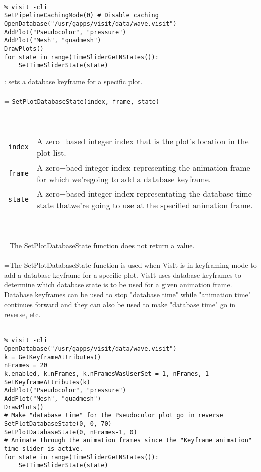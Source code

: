 \documentclass[10pt,a4paper]{report}
\begin{document}
\\[-6mm]
\begin{verbatim}% visit -cli
SetPipelineCachingMode(0) # Disable caching
OpenDatabase("/usr/gapps/visit/data/wave.visit")
AddPlot("Pseudocolor", "pressure")
AddPlot("Mesh", "quadmesh")
DrawPlots()
for state in range(TimeSliderGetNStates()):
    SetTimeSliderState(state)
\end{verbatim}
\newpage


{}
: sets a database keyframe for a specific plot.\\[-3mm]

 \\ 
\hangindent=\parindent 
\verb!SetPlotDatabaseState(index, frame, state)!\\ [-3mm]

 \\ 
\hangindent=\parindent 
\begin{tabular}{lp{9cm}}
\verb!index! & A zero$-$based integer index that is the plot's location in the plot list. \\
\verb!frame! & A zero$-$baed integer index representing the animation frame for which we'regoing to add a database keyframe. \\
\verb!state! & A zero$-$based integer index representating the database time state thatwe're going to use at the specified animation frame. \\
\end{tabular} \\[-2mm]


 \\ 
\hangindent=\parindent The SetPlotDatabaseState function does not return a value. \\[-3mm] 

 \\ 
\hangindent=\parindent The SetPlotDatabaseState function is used when VisIt is in keyframing mode to add a database keyframe for a specific plot. VisIt uses database keyframes to determine which database state is to be used for a given animation frame. Database keyframes can be used to stop "database time" while "animation time" continues forward and they can also be used to make "database time" go in reverse, etc. \\[-3mm] 

\\[-6mm]
\begin{verbatim}% visit -cli
OpenDatabase("/usr/gapps/visit/data/wave.visit")
k = GetKeyframeAttributes()
nFrames = 20
k.enabled, k.nFrames, k.nFramesWasUserSet = 1, nFrames, 1
SetKeyframeAttributes(k)
AddPlot("Pseudocolor", "pressure")
AddPlot("Mesh", "quadmesh")
DrawPlots()
# Make "database time" for the Pseudocolor plot go in reverse
SetPlotDatabaseState(0, 0, 70)
SetPlotDatabaseState(0, nFrames-1, 0)
# Animate through the animation frames since the "Keyframe animation"
time slider is active.
for state in range(TimeSliderGetNStates()):
    SetTimeSliderState(state)
\end{verbatim}
\newpage
\end{document}
